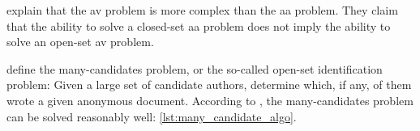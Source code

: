 \citet{koppel_determining_2014} explain that the \ac{av} problem is more complex than the \ac{aa} problem.
They claim that the ability to solve a closed-set \ac{aa} problem does not imply the ability to solve an open-set \ac{av} problem.

\citet{koppel_determining_2014} define the many-candidates problem, or the so-called open-set identification problem:
Given a large set of candidate authors, determine which, if any, of them wrote a given anonymous document.
According to \citet{koppel_determining_2014}, the many-candidates problem can be solved reasonably well: \autoref{lst:many_candidate_algo}.